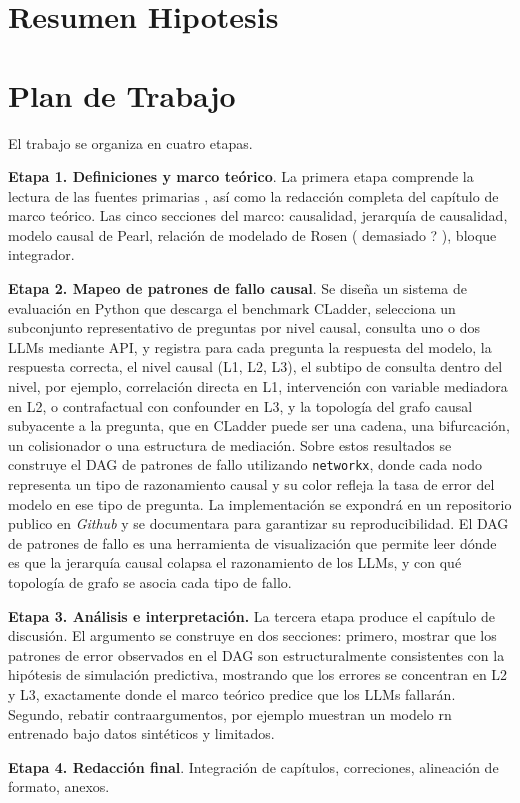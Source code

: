\section{Resumen Hipotesis}

\section{Plan de Trabajo}

El trabajo se organiza en cuatro etapas.

\textbf{Etapa 1. Definiciones y marco teórico}. 
La primera etapa comprende la lectura de las 
fuentes primarias , así como la redacción completa del 
capítulo de marco teórico. Las cinco secciones del marco: causalidad, jerarquía de causalidad, modelo causal de Pearl, relación de modelado de Rosen ( demasiado ? ), bloque integrador. 

\textbf{Etapa 2. Mapeo de patrones de fallo causal}. Se diseña un sistema de evaluación en Python que descarga el benchmark CLadder, selecciona un subconjunto representativo de preguntas por 
nivel causal, consulta uno o dos LLMs mediante API, y registra para cada pregunta la respuesta del modelo, la respuesta 
correcta, el nivel causal (L1, L2, L3), el subtipo de consulta dentro 
del nivel, por ejemplo, correlación directa en L1, intervención con 
variable mediadora en L2, o contrafactual con confounder en L3, y la 
topología del grafo causal subyacente a la pregunta, que en CLadder 
puede ser una cadena, una bifurcación, un colisionador o una estructura 
de mediación. Sobre estos resultados 
se construye el DAG de patrones de fallo utilizando \texttt{networkx}, donde 
cada nodo representa un tipo de razonamiento causal y su color refleja la 
tasa de error del modelo en ese tipo de pregunta. La implementación se 
expondrá en un repositorio publico en \textit{Github} y se documentara para garantizar su reproducibilidad. El DAG de patrones de fallo es una herramienta de visualización que permite leer dónde es que la jerarquía causal colapsa el razonamiento de los LLMs, y con qué topología de grafo se asocia cada tipo de fallo. 

\textbf{Etapa 3. Análisis e interpretación.}
La tercera etapa produce el capítulo de discusión. El argumento se construye 
en dos secciones: primero, mostrar que los patrones de error observados en 
el DAG son estructuralmente consistentes con la hipótesis de simulación 
predictiva, mostrando que los errores se concentran en L2 y L3, exactamente donde el 
marco teórico predice que los LLMs fallarán.  
Segundo, rebatir contraargumentos, por ejemplo
\textcite{butkus2025causal}  muestran un modelo rn entrenado bajo datos sintéticos y limitados. 

\textbf{Etapa 4. Redacción final}. Integración de capítulos, correciones, alineación de formato, anexos. 